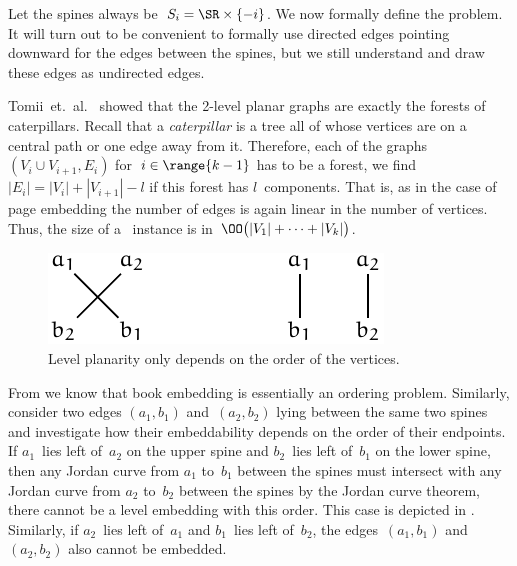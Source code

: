 Let the spines always be~$S_i = \SR \times \{-i\}$. We now formally define
the problem. It will turn out to be convenient to formally use directed edges pointing downward for the edges between the spines, but we still understand and draw these edges as undirected edges.


Tomii~et.~al.~\cite{Tomii77} showed that the 2-level planar graphs are exactly the forests
of caterpillars. Recall that a \emph{caterpillar} is a tree all of whose vertices are on
a central path or one edge away from it. Therefore, each of the graphs~$(V_i \cup V_{i+1}, E_i)$ for~$i \in \range{k-1}$ has to be a forest, \ie we find~$|E_i| = |V_i| + |V_{i+1}| - l$ if this
forest has $l$~components. That is, as in the case of page embedding the number of edges is again linear in
the number of vertices. Thus, the size of a \probMul~instance is in~$\OO\bigl(|V_1| + \dotsb + |V_k|\bigr)$.

\begin{figure}[\placement]\centering
    \includegraphics{figures/t_level_order}
    \caption[Level planarity is an ordering problem]{Level planarity only depends on the order of the vertices.}
    \label{figure:level_order}
\end{figure}

From  we know that book embedding is essentially an ordering problem.
Similarly, consider two edges $(a_1, b_1)$ and~$(a_2, b_2)$ lying between the same two spines
and investigate how their embeddability depends on the order of their endpoints. If
$a_1$~lies left of~$a_2$ on the upper spine and $b_2$~lies left of~$b_1$ on the lower spine, then any Jordan curve from $a_1$ to~$b_1$ between the spines must intersect with any Jordan curve from $a_2$ to~$b_2$ between the spines by the Jordan curve theorem, \ie there cannot 
be a level embedding with this order. This case is depicted in . Similarly,
if $a_2$~lies left of~$a_1$ and $b_1$~lies left of~$b_2$, the edges~$(a_1, b_1)$ and~$(a_2, b_2)$ also
cannot be embedded.

